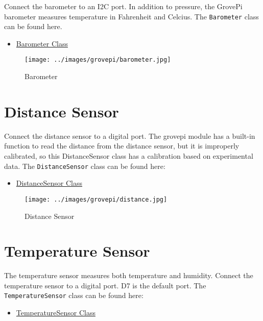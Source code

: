 Connect the barometer to an I2C port. In addition to pressure, the
GrovePi barometer measures temperature in Fahrenheit and Celcius. The
\texttt{Barometer} class can be found here.

\begin{itemize}

\item
  \href{https://github.com/cloudmesh/cloudmesh.pi/blob/master/cloudmesh/pi/barometer.py}{Barometer
  Class}
\end{itemize}

\begin{figure}
\centering
\texttt{[image: ../images/grovepi/barometer.jpg]}
\caption{Barometer}
\end{figure}

\section{Distance Sensor}\label{distance-sensor}

Connect the distance sensor to a digital port. The grovepi module has a
built-in function to read the distance from the distance sensor, but it
is improperly calibrated, so this DistanceSensor class has a calibration
based on experimental data. The \texttt{DistanceSensor} class can be
found here:

\begin{itemize}

\item
  \href{https://github.com/cloudmesh/cloudmesh.pi/blob/master/cloudmesh/pi/distance.py}{DistanceSensor
  Class}
\end{itemize}

\begin{figure}
\centering
\texttt{[image: ../images/grovepi/distance.jpg]}
\caption{Distance Sensor}
\end{figure}

\section{Temperature Sensor}\label{temperature-sensor}

The temperature sensor measures both temperature and humidity. Connect
the temperature sensor to a digital port. D7 is the default port. The
\texttt{TemperatureSensor} class can be found here:

\begin{itemize}

\item
  \href{https://github.com/cloudmesh/cloudmesh.pi/blob/master/cloudmesh/pi/temperature.py}{TemperatureSensor
  Class}
\end{itemize}

